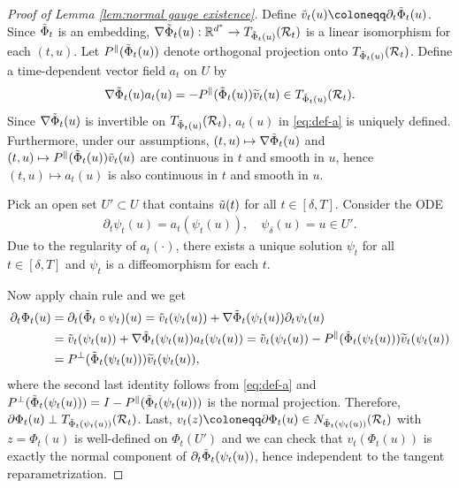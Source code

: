 \documentclass[11pt]{article}
\newcommand{\mb}{\mathbb}
\newcommand{\mc}{\mathcal}
\begin{document}
\begin{proof}[Proof of Lemma \ref{lem:normal gauge existence}] Define $\Tilde{v}_t(u)\coloneqq \partial_t \Tilde{\Phi}_t(u)$. Since $\Tilde{\Phi}_t$ is an embedding, $\nabla\Tilde{\Phi}_t(u): \mb{R}^{d^*}\to T_{\Tilde{\Phi}_t(u)}(\mc{R}_t)$ is a linear isomorphism for each $(t,u)$. Let $P^\parallel(\Tilde{\Phi}_t(u))$ denote orthogonal projection onto $T_{\Tilde{\Phi}_t(u)}(\mc{R}_t)$. Define a time-dependent vector field $a_t$ on $U$ by
\begin{align}\label{eq:def-a}
\nabla\Tilde{\Phi}_t(u) a_t(u) = -P^\parallel(\Tilde{\Phi}_t(u))\widetilde v_t(u)\in T_{\Tilde{\Phi}_t(u)}(\mc R_t).
\end{align}
Since $\nabla\Tilde{\Phi}_t(u)$ is invertible on $T_{\Tilde{\Phi}_t(u)}(\mc{R}_t)$, $a_t(u)$ in \eqref{eq:def-a} is uniquely defined. Furthermore, under our assumptions, $(t,u)\mapsto \nabla\Tilde{\Phi}_t(u)$ and $(t,u)\mapsto P^\parallel(\Tilde{\Phi}_t(u))\Tilde{v}_t(u)$ are continuous in $t$ and smooth in $u$, hence $(t,u)\mapsto a_t(u)$ is also continuous in $t$ and smooth in $u$.   

\noindent Pick an open set $U'\subset U$ that contains $\Tilde{u}(t)$ for all $t\in [\delta,T]$. Consider the ODE
\begin{align}\label{eq:time-dependent ODE}
    \partial_t \psi_t(u) = a_t(\psi_t(u)),\quad \psi_\delta(u)=u\in U'.
\end{align}
Due to the regularity of $a_t(\cdot)$, there exists a unique solution $\psi_t$ for all $t\in [\delta,T]$ and $\psi_t$ is a diffeomorphism for each $t$.

\noindent Now apply chain rule and we get
\begin{align*}
    \partial_t \Phi_t(u) & = \partial_t ( \Tilde{\Phi}_t \circ \psi_t )(u) = \Tilde{v}_t(\psi_t(u)) + \nabla\Tilde{\Phi}_t(\psi_t(u))\partial_t\psi_t(u) \\
    &= \Tilde{v}_t(\psi_t(u)) + \nabla\Tilde{\Phi}_t(\psi_t(u))a_t(\psi_t(u))  = \Tilde{v}_t(\psi_t(u)) - P^\parallel( \Tilde{\Phi}_t(\psi_t(u)))\widetilde v_t(\psi_t(u))\\
    & = P^\perp( \Tilde{\Phi}_t(\psi_t(u)))\widetilde v_t(\psi_t(u)),
\end{align*}
where the second last identity follows from \eqref{eq:def-a} and $P^\perp( \Tilde{\Phi}_t(\psi_t(u)))= I - P^\parallel( \Tilde{\Phi}_t(\psi_t(u)))$ is the normal projection. Therefore, $\partial\Phi_t(u)\perp T_{\Tilde{\Phi}_t(\psi_t(u))}(\mc{R}_t)$. Last, $v_t(z)\coloneqq \partial\Phi_t(u)\in N_{\Tilde{\Phi}_t(\psi_t(u))}(\mc{R}_t)$ with $z=\Phi_t(u)$ is well-defined on $\Phi_t(U')$ and we can check that $v_t(\Phi_t(u))$ is exactly the normal component of $\partial_t\Tilde{\Phi}_t(\psi_t(u))$, hence independent to the tangent reparametrization.
\end{proof}
\end{document}
